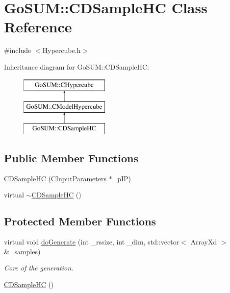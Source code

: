 \hypertarget{class_go_s_u_m_1_1_c_d_sample_h_c}{\section{Go\-S\-U\-M\-:\-:C\-D\-Sample\-H\-C Class Reference}
\label{class_go_s_u_m_1_1_c_d_sample_h_c}
}


{\ttfamily \#include $<$Hypercube.\-h$>$}

Inheritance diagram for Go\-S\-U\-M\-:\-:C\-D\-Sample\-H\-C\-:\begin{figure}[H]
\begin{center}
\leavevmode
\includegraphics[height=3.000000cm]{class_go_s_u_m_1_1_c_d_sample_h_c}
\end{center}
\end{figure}
\subsection*{Public Member Functions}
\begin{DoxyCompactItemize}
\item 
\hyperlink{class_go_s_u_m_1_1_c_d_sample_h_c_a0140af8d61345c6108877a29b25e9e5d}{C\-D\-Sample\-H\-C} (\hyperlink{class_go_s_u_m_1_1_c_input_parameters}{C\-Input\-Parameters} $\ast$\-\_\-p\-I\-P)
\item 
virtual \hyperlink{class_go_s_u_m_1_1_c_d_sample_h_c_a423825a6ac94ef7707af0594077cefb3}{$\sim$\-C\-D\-Sample\-H\-C} ()
\end{DoxyCompactItemize}
\subsection*{Protected Member Functions}
\begin{DoxyCompactItemize}
\item 
virtual void \hyperlink{class_go_s_u_m_1_1_c_d_sample_h_c_aaa41eae7d120c7bf8d29ed2a0dc5c470}{do\-Generate} (int \-\_\-rssize, int \-\_\-dim, std\-::vector$<$ Array\-Xd $>$ \&\-\_\-samples)
\begin{DoxyCompactList}\small\item\em Core of the generation. \end{DoxyCompactList}\item 
\hyperlink{class_go_s_u_m_1_1_c_d_sample_h_c_a2c6787e78cca3e6f934c766f027d12c5}{C\-D\-Sample\-H\-C} ()
\end{DoxyCompactItemize}

